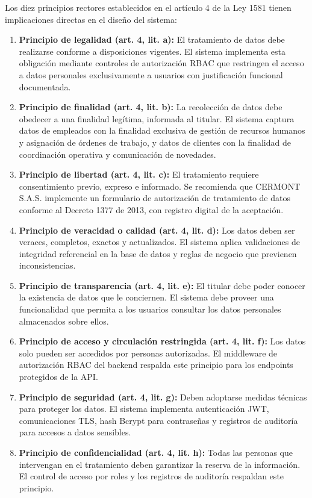 Los diez principios rectores establecidos en el artículo 4 de la Ley 1581 tienen implicaciones directas en el diseño del sistema:

\begin{enumerate}
    \item \textbf{Principio de legalidad (art. 4, lit. a):} El tratamiento de datos debe realizarse conforme a disposiciones vigentes. El sistema implementa esta obligación mediante controles de autorización RBAC que restringen el acceso a datos personales exclusivamente a usuarios con justificación funcional documentada.
    \item \textbf{Principio de finalidad (art. 4, lit. b):} La recolección de datos debe obedecer a una finalidad legítima, informada al titular. El sistema captura datos de empleados con la finalidad exclusiva de gestión de recursos humanos y asignación de órdenes de trabajo, y datos de clientes con la finalidad de coordinación operativa y comunicación de novedades.
    \item \textbf{Principio de libertad (art. 4, lit. c):} El tratamiento requiere consentimiento previo, expreso e informado. Se recomienda que CERMONT S.A.S. implemente un formulario de autorización de tratamiento de datos conforme al Decreto 1377 de 2013, con registro digital de la aceptación.
    \item \textbf{Principio de veracidad o calidad (art. 4, lit. d):} Los datos deben ser veraces, completos, exactos y actualizados. El sistema aplica validaciones de integridad referencial en la base de datos y reglas de negocio que previenen inconsistencias.
    \item \textbf{Principio de transparencia (art. 4, lit. e):} El titular debe poder conocer la existencia de datos que le conciernen. El sistema debe proveer una funcionalidad que permita a los usuarios consultar los datos personales almacenados sobre ellos.
    \item \textbf{Principio de acceso y circulación restringida (art. 4, lit. f):} Los datos solo pueden ser accedidos por personas autorizadas. El middleware de autorización RBAC del backend respalda este principio para los endpoints protegidos de la API.
    \item \textbf{Principio de seguridad (art. 4, lit. g):} Deben adoptarse medidas técnicas para proteger los datos. El sistema implementa autenticación JWT, comunicaciones TLS, hash Bcrypt para contraseñas y registros de auditoría para accesos a datos sensibles.
    \item \textbf{Principio de confidencialidad (art. 4, lit. h):} Todas las personas que intervengan en el tratamiento deben garantizar la reserva de la información. El control de acceso por roles y los registros de auditoría respaldan este principio.
\end{enumerate}

